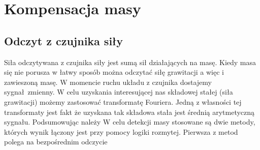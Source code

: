 \documentclass[a4paper]{article}
\begin{document}
\section{Kompensacja masy}
\subsection{Odczyt z czujnika siły}
Siła odczytywana z czujnika siły jest sumą sił działających na masę. Kiedy masa się nie porusza w łatwy sposób można odczytać siłę grawitacji a więc i zawieszoną masę. W momencie ruchu układu z czujnika dostajemy sygnał zmienny. W celu uzyskania interesującej nas składowej stałej (siła grawitacji) możemy zastosować transformatę Fouriera. Jedną z własności tej transformaty jest fakt że uzyskana tak składowa stała jest średnią arytmetyczną sygnału. Podsumowując należy
W celu detekcji masy stosowane są dwie metody, których wynik łączony jest przy pomocy logiki rozmytej. Pierwsza z metod polega na bezpośrednim odczycie
\end{document}
